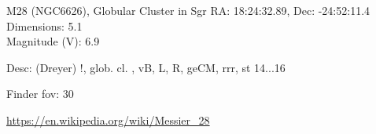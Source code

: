 \begin{block}{M28 (NGC6626), Globular Cluster in Sgr}
    RA: 18:24:32.89, Dec: -24:52:11.4 \\ 
    Dimensions: 5.1 \\ 
    Magnitude (V): 6.9


    Desc: (Dreyer) !, glob. cl. , vB, L, R, geCM, rrr, st 14...16 

    Finder fov: 30 

    \url{https://en.wikipedia.org/wiki/Messier_28} 
\end{block}